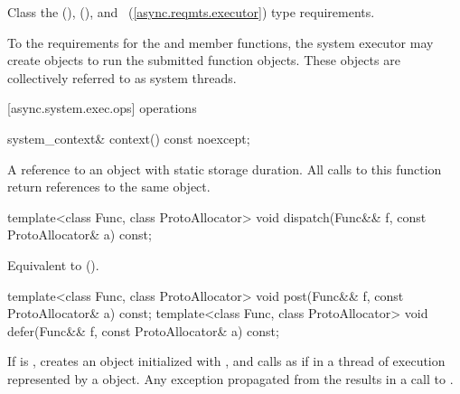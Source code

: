 \pnum
Class   the  (),  (), and ~(\ref{async.reqmts.executor}) type requirements.

\pnum
To  the  requirements for the  and  member functions, the system executor may create  objects to run the submitted function objects. These  objects are collectively referred to as system threads.


[async.system.exec.ops]{ operations}

%
\begin{itemdecl}
system_context& context() const noexcept;
\end{itemdecl}

\begin{itemdescr}
\pnum
\returns A reference to an object with static storage duration. All calls to this function return references to the same object.
\end{itemdescr}

%
\begin{itemdecl}
template<class Func, class ProtoAllocator>
  void dispatch(Func&& f, const ProtoAllocator& a) const;
\end{itemdecl}

\begin{itemdescr}
\pnum
\effects Equivalent to  ().
\end{itemdescr}

%
%
\begin{itemdecl}
template<class Func, class ProtoAllocator>
  void post(Func&& f, const ProtoAllocator& a) const;
template<class Func, class ProtoAllocator>
  void defer(Func&& f, const ProtoAllocator& a) const;
\end{itemdecl}

\begin{itemdescr}
\pnum
\effects If  is ,
creates an object  initialized with ,
and calls  as if in a thread of execution represented by a  object.
Any exception propagated from the 
results in a call to .
\end{itemdescr}



